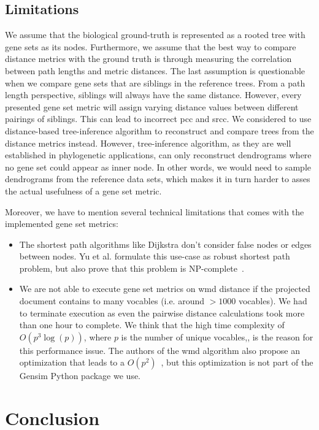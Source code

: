 \documentclass{thesisclass}
\begin{document}
\section{Limitations}

We assume that the biological ground-truth is represented as a rooted tree with gene sets as its nodes. 
Furthermore, we assume that the best way to compare distance metrics with the ground truth is through measuring the correlation between path lengths and metric distances. 
The last assumption is questionable when we compare gene sets that are siblings in the reference trees. 
From a path length perspective, siblings will always have the same distance.
However, every presented gene set metric will assign varying distance values between different pairings of siblings. 
This can lead to incorrect \acrshort{pcc} and \acrshort{srcc}. 
We considered to use distance-based tree-inference algorithm to reconstruct and compare trees from the distance metrics instead.
However, tree-inference algorithm, as they are well established in phylogenetic applications, can only reconstruct dendrograms where no gene set could appear as inner node.
In other words, we would need to sample dendrograms from the reference data sets, which makes it in turn harder to asses the actual usefulness of a gene set metric.

Moreover, we have to mention several technical limitations that comes with the implemented gene set metrics:
\begin{itemize}
	\item The shortest path algorithms like Dijkstra don't consider false nodes or edges between nodes.
	Yu et al. formulate this use-case  as robust shortest path problem, but also prove that this problem is NP-complete~\cite{YU1998457}.
	\item We are not able to execute gene set metrics on \acrshort{wmd} distance if the projected document contains to many vocables (i.e. around $>1000$ vocables). We had to terminate execution as even the pairwise distance calculations took more than one hour to complete. We think that the high time complexity of $O(p^3 \log(p))$, where $p$ is the number of unique vocables,, is the reason for this performance issue. 
	The authors of the \acrshort{wmd} algorithm also propose an optimization that leads to a $O(p^2)$~\cite{KIM2017122}, but this optimization is not part of the Gensim Python package we use.
\end{itemize}

\chapter{Conclusion}
\label{ch:conclusion}
\end{document}
